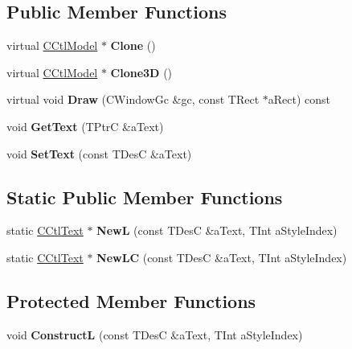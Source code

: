 \subsection*{Public Member Functions}
\begin{DoxyCompactItemize}
\item 
\mbox{\label{classCCtlText_a6f9c29066dff07c8231ef6e12d32e2ec}} 
virtual \hyperlink{classCCtlModel}{C\+Ctl\+Model} $\ast$ {\bfseries Clone} ()
\item 
\mbox{\label{classCCtlText_a2cdb8b10f87f3f470c97801129931fd6}} 
virtual \hyperlink{classCCtlModel}{C\+Ctl\+Model} $\ast$ {\bfseries Clone3D} ()
\item 
\mbox{\label{classCCtlText_a63d72ea3f9b9bafea7cf011d15e87bc4}} 
virtual void {\bfseries Draw} (C\+Window\+Gc \&gc, const T\+Rect $\ast$a\+Rect) const
\item 
\mbox{\label{classCCtlText_a3fa7aa2abdcef26bee1b1f6612c5e7a6}} 
void {\bfseries Get\+Text} (T\+PtrC \&a\+Text)
\item 
\mbox{\label{classCCtlText_ad59eebb9e02b580efc129c7bbfe79750}} 
void {\bfseries Set\+Text} (const T\+DesC \&a\+Text)
\end{DoxyCompactItemize}
\subsection*{Static Public Member Functions}
\begin{DoxyCompactItemize}
\item 
\mbox{\label{classCCtlText_a13a1f4c0a0d1e433e61603dbde1c84e1}} 
static \hyperlink{classCCtlText}{C\+Ctl\+Text} $\ast$ {\bfseries NewL} (const T\+DesC \&a\+Text, T\+Int a\+Style\+Index)
\item 
\mbox{\label{classCCtlText_a634f0346de9b9ebcf757f6ba8816ede5}} 
static \hyperlink{classCCtlText}{C\+Ctl\+Text} $\ast$ {\bfseries New\+LC} (const T\+DesC \&a\+Text, T\+Int a\+Style\+Index)
\end{DoxyCompactItemize}
\subsection*{Protected Member Functions}
\begin{DoxyCompactItemize}
\item 
\mbox{\label{classCCtlText_ad74d1e3b0492b2175bc756d661daa025}} 
void {\bfseries ConstructL} (const T\+DesC \&a\+Text, T\+Int a\+Style\+Index)
\end{DoxyCompactItemize}
